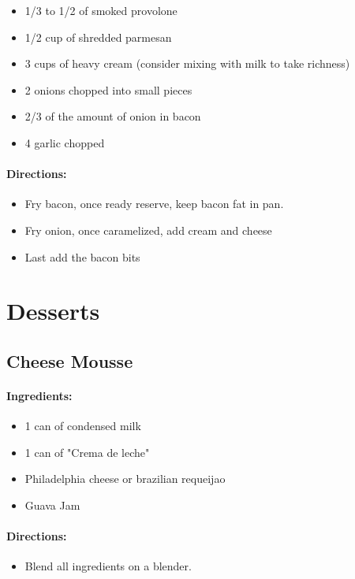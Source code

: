\documentclass{article}
\begin{document}
\begin{itemize}
	\item 1/3 to 1/2 of smoked provolone
	\item 1/2 cup of shredded parmesan
	\item 3 cups of heavy cream (consider mixing with milk to take richness)
	\item 2 onions chopped into small pieces
	\item 2/3 of the amount of onion in bacon
	\item 4 garlic chopped
\end{itemize}

\paragraph{Directions:}
\begin{itemize}
	\item Fry bacon, once ready reserve, keep bacon fat in pan.
	\item Fry onion, once caramelized, add cream and cheese
	\item Last add the bacon bits
\end{itemize}

\section{Desserts}

\subsection{Cheese Mousse}

\paragraph{Ingredients:}
\begin{itemize}
	\item 1 can of condensed milk
	\item 1 can of "Crema de leche"
	\item Philadelphia cheese or brazilian requeijao
	\item Guava Jam
\end{itemize}

\paragraph{Directions:}
\begin{itemize}
	\item Blend all ingredients on a blender.
\end{itemize}
\end{document}
